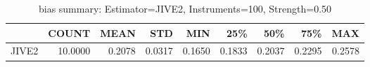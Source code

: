 \begin{table}[ht]
\centering
\caption{bias summary: Estimator=JIVE2, Instruments=100, Strength=0.50}
\begin{tabular}{lrrrrrrrr}
\toprule
 & COUNT & MEAN & STD & MIN & 25\% & 50\% & 75\% & MAX \\
\midrule
JIVE2 & 10.0000 & 0.2078 & 0.0317 & 0.1650 & 0.1833 & 0.2037 & 0.2295 & 0.2578 \\
\bottomrule
\end{tabular}
\end{table}
